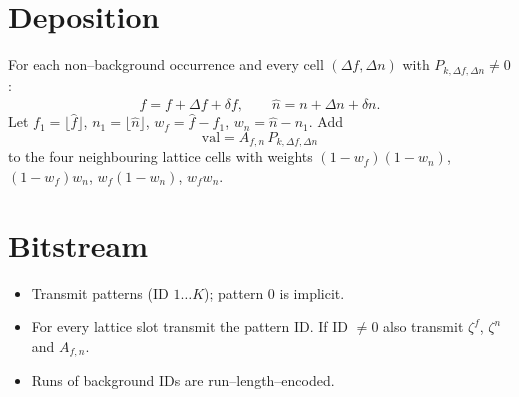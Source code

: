 \documentclass[11pt]{article}
\begin{document}
\section{Deposition}

For each non--background occurrence and every cell
$(\Delta f,\Delta n)$ with $P_{k,\Delta f,\Delta n}\neq 0$:
\[
\hat f = f+\Delta f+\delta f,\qquad
\hat n = n+\Delta n+\delta n.
\]
Let $f_1=\lfloor\hat f\rfloor$, $n_1=\lfloor\hat n\rfloor$,
$w_f=\hat f-f_1$, $w_n=\hat n-n_1$.
Add
\[
\text{val}=A_{f,n}\,P_{k,\Delta f,\Delta n}
\]
to the four neighbouring lattice cells
with weights $(1-w_f)(1-w_n)$, $(1-w_f)w_n$, $w_f(1-w_n)$, $w_f w_n$.

\section{Bitstream}

\begin{itemize}
  \item Transmit patterns (ID $1\dots K$); pattern 0 is implicit.
  \item For every lattice slot transmit the pattern ID.  
        If ID $\neq 0$ also transmit $\zeta^{f}$, $\zeta^{n}$ and $A_{f,n}$.
  \item Runs of background IDs are run--length--encoded.
\end{itemize}
\end{document}
